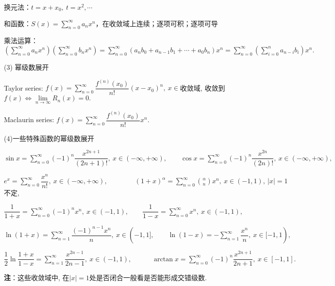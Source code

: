 \documentclass[UTF8]{ctexart}
\numberwithin{equation}{section}
\numberwithin{figure}{section}
\numberwithin{table}{section}
\newcommand\no{\noindent}
\newcommand\dis{\displaystyle}
\newcommand\limn{\dis\lim\limits_{n\to\infty}}
\newcommand\sumn{\dis\sum\limits_{n=1}^{\infty}}
\newcommand\sumnz{\dis\sum\limits_{n=0}^{\infty}}
\newcommand\sumizn{\dis\sum\limits_{i=0}^{n}}
\begin{document}
\begin{spacing}{2}
换元法：$t=x+x_0,\ t=x^2,\cdots$

和函数：$S(x)=\sumnz a_nx^n$，在收敛域上连续；逐项可积；逐项可导

\vspace{0.2cm}

乘法运算：$\left(\sumnz a_nx^n\right)\left(\sumnz b_nx^n\right)
=\sumnz(a_nb_0+a_{n-1}b_1+\cdots+a_0b_n)x^n
=\sumnz\left(\sumizn a_{n-i}b_i\right)x^n.$

\vspace{0.2cm}

\no(3) 幂级数展开

Taylor series: $f(x)=\sumnz\dfrac{f^{(n)}(x_0)}{n!}(x-x_0)^n,\ x\in$收敛域, 
收敛到$f(x)\Longleftrightarrow\limn R_n(x)=0.$

\vspace{0.2cm}

Maclaurin series: $f(x)=\sumnz\dfrac{f^{(n)}(x_0)}{n!}x^n.$

\vspace{0.2cm}

\no(4)一些特殊函数的幂级数展开

\vspace{0.2cm}

$\sin x=\sumnz(-1)^n\dfrac{x^{2n+1}}{(2n+1)!},\ x\in(-\infty,+\infty),\qquad
\cos x=\sumnz (-1)^n\dfrac{x^{2n}}{(2n)!},\ x\in(-\infty,+\infty),$

\vspace{0.2cm}

$e^x=\sumnz\dfrac{x^n}{n!},\ x\in(-\infty,+\infty),\qquad\qquad(1+x)^\alpha=\sumnz\binom{\alpha}{n}x^n,\ x\in(-1,1),\ |x|=1$不定,

\vspace{0.2cm}

$\dfrac{1}{1+x}=\sumnz(-1)^nx^n,\ x\in(-1,1),\qquad
\dfrac{1}{1-x}=\sumnz x^n,\ x\in(-1,1),$

\vspace{0.2cm}

$\ln(1+x)=\sumn\dfrac{ (-1)^{n-1}x^{n}}{n},\ 
x\in(-1,1],\qquad
\ln(1-x)=-\sumn\dfrac{x^{n}}{n},\ x\in[-1,1),$

\vspace{0.2cm}

$\dfrac{1}{2}\ln\dfrac{1+x}{1-x}=\sumn\dfrac{x^{2n-1}}{2n-1},\ x\in(-1,1),
\qquad\quad
\arctan x=\sumnz(-1)^n\dfrac{x^{2n+1}}{2n+1},\ x\in[-1,1].$

\vspace{0.2cm}

\textbf{注}：这些收敛域中, 在$|x|=1$处是否闭合一般看是否能形成交错级数.


\end{spacing}
\end{document}
